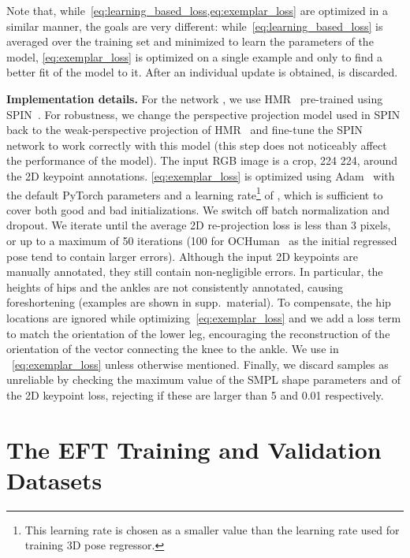 \documentclass[10pt,twocolumn,letterpaper]{article}
\begin{document}
	Note that, while~\cref{eq:learning_based_loss,eq:exemplar_loss} are optimized in a similar manner, the goals are very different:
	while~\cref{eq:learning_based_loss} is averaged over the training set and minimized to learn the parameters  of the model, \cref{eq:exemplar_loss} is optimized on a single example and only to find a better fit  of the model to it.
	After an individual update  is obtained,  is discarded.
	
	
	\noindent\textbf{Implementation details.}
For the network , we use HMR~\cite{kanazawa2018end} pre-trained using SPIN~\cite{kolotouros2019spin}.
	For robustness, we change the perspective projection model used in SPIN back to the weak-perspective projection of HMR~\cite{kanazawa2018end} and fine-tune the SPIN network to work correctly with this model (this step does not noticeably affect the performance of the model).
The input RGB image  is a crop, 224  224, around the 2D keypoint annotations.
	\cref{eq:exemplar_loss} is optimized using Adam~\cite{kingma2014adam} with the default PyTorch parameters and a learning rate\footnote{This learning rate is chosen as a smaller value than the learning rate  used for training 3D pose regressor.} of , which is sufficient to cover both good and bad initializations.  We switch off batch normalization and dropout.
We iterate until the average 2D re-projection loss is less than 3 pixels, or up to a maximum of 50 iterations (100 for OCHuman~\cite{pose2seg2019} as the initial regressed pose tend to contain larger errors).
Although the input 2D keypoints are manually annotated, they still contain non-negligible errors. In particular, the heights of hips and the ankles are not consistently annotated, causing foreshortening (examples are shown in supp.~material).
	To compensate, the hip locations are ignored while optimizing~\cref{eq:exemplar_loss} and we add a loss term to match the orientation of the lower leg, encouraging the reconstruction of the orientation of the vector connecting the knee to the ankle. We use  in ~\cref{eq:exemplar_loss} unless otherwise mentioned.
Finally, we discard samples as unreliable by checking the maximum value of the SMPL shape parameters and of the 2D keypoint loss, rejecting if these are larger than 5 and 0.01 respectively. 

\section{The EFT Training and Validation Datasets}\label{s:benchmark}
	
\end{document}
